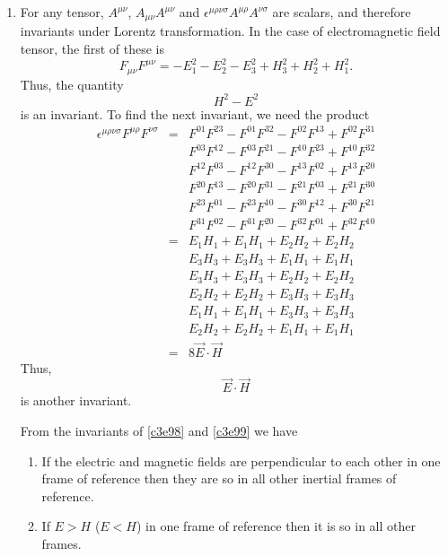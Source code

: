 \begin{enumerate}
\item For any tensor, $A^{\mu\nu}$, $A_{\mu\nu}A^{\mu\nu}$ and 
$\epsilon^{\mu\rho\nu\sigma}A^{\mu\rho}A^{\nu\sigma}$ are scalars, and therefore
invariants under Lorentz transformation. In the case of electromagnetic field
tensor, the first of these is
\[
F_{\mu\nu}F^{\mu\nu} = -E_1^2 - E_2^2 - E_3^2 + H_3^2 + H_2^2 + H_1^2.
\]
Thus, the quantity 
\begin{equation}\label{c3e98}
H^2 - E^2
\end{equation}
is an invariant. To find the next invariant, we
need the product
\begin{eqnarray*}
\epsilon^{\mu\rho\nu\sigma}F^{\mu\rho}F^{\nu\sigma} &=& 
	 F^{01}F^{23} - F^{01}F^{32} - F^{02}F^{13} + F^{02}F^{31} \\
 & & F^{03}F^{12} - F^{03}F^{21} - F^{10}F^{23} + F^{10}F^{32} \\
 & & F^{12}F^{03} - F^{12}F^{30} - F^{13}F^{02} + F^{13}F^{20} \\
 & & F^{20}F^{13} - F^{20}F^{31} - F^{21}F^{03} + F^{21}F^{30} \\
 & & F^{23}F^{01} - F^{23}F^{10} - F^{30}F^{12} + F^{30}F^{21} \\
 & & F^{31}F^{02} - F^{31}F^{20} - F^{32}F^{01} + F^{32}F^{10} \\
 &=& E_1H_1 + E_1H_1 + E_2H_2 + E_2H_2 \\
 & & E_3H_3 + E_3H_3 + E_1H_1 + E_1H_1 \\
 & & E_3H_3 + E_3H_3 + E_2H_2 + E_2H_2 \\
 & & E_2H_2 + E_2H_2 + E_3H_3 + E_3H_3 \\
 & & E_1H_1 + E_1H_1 + E_3H_3 + E_3H_3 \\
 & & E_2H_2 + E_2H_2 + E_1H_1 + E_1H_1 \\
 &=& 8\vec{E}\cdot\vec{H}
\end{eqnarray*}
Thus, \begin{equation}\label{c3e99}
\vec{E}\cdot\vec{H}
\end{equation}
is another invariant.

From the invariants of \eqref{c3e98} and \eqref{c3e99} we have
\begin{enumerate}
\item If the electric and magnetic fields are
perpendicular to each other in one frame of reference then they are so in all 
other inertial frames of reference.

\item If $E > H$ ($E < H$) in one frame of reference then it is so in all other
frames.


\end{enumerate}
\end{enumerate}
